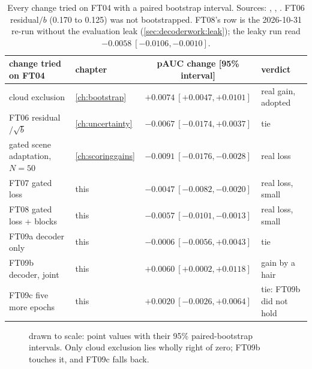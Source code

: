 \begin{table}[htbp]
\centering\small
\begin{tabular}{llcl}
\toprule
change tried on FT04 & chapter & pAUC change [95\% interval] & verdict\\
\midrule
cloud exclusion & \ref{ch:bootstrap} & $+0.0074\ [+0.0047,+0.0101]$ & real gain, adopted\\
FT06 residual$/\sqrt b$ & \ref{ch:uncertainty} & $-0.0067\ [-0.0174,+0.0037]$ & tie\\
gated scene adaptation, $N=50$ & \ref{ch:scoringgains} & $-0.0091\ [-0.0176,-0.0028]$ & real loss\\
FT07 gated loss & this & $-0.0047\ [-0.0082,-0.0020]$ & real loss, small\\
FT08 gated loss + blocks & this & $-0.0057\ [-0.0101,-0.0013]$ & real loss, small\\
FT09a decoder only & this & $-0.0006\ [-0.0056,+0.0043]$ & tie\\
FT09b decoder, joint & this & $+0.0060\ [+0.0002,+0.0118]$ & gain by a hair\\
FT09c five more epochs & this & $+0.0020\ [-0.0026,+0.0064]$ & tie: FT09b did not hold\\
\bottomrule
\end{tabular}
\caption{Every change tried on FT04 with a paired bootstrap interval. Sources: ,
, . FT06 residual$/b$ (0.170 to 0.125) was not
bootstrapped. FT08's row is the 2026-10-31 re-run without the evaluation leak (\cref{sec:decoderwork:leak}); the
leaky run read $-0.0058\ [-0.0106,-0.0010]$.}
\label{tab:decoderwork:cumulative}
\end{table}

\begin{figure}[htbp]
\centering
{}
\caption{ drawn to scale: point values with their 95\% paired-bootstrap
intervals. Only cloud exclusion lies wholly right of zero; FT09b touches it, and FT09c falls back.}
\label{fig:decoderwork:intervals}
\end{figure}

